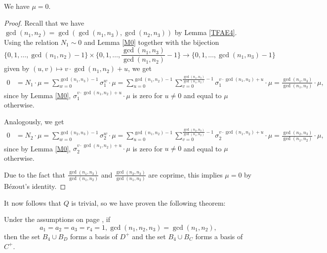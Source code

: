 \begin{prop}
We have $\mu=0.$
\end{prop}
\begin{proof}
Recall that we have $\gcd(n_1,n_2)=\gcd(\gcd(n_1,n_3),\gcd(n_2,n_3))$ by Lemma \ref{TFAE4}. Using the relation $N_1\sim 0$ and Lemma \ref{M0} together with the bijection $$\{0,1,\dots,\gcd(n_1,n_2)-1\}\times \{0,1,\dots,\frac{\gcd(n_1,n_3)}{\gcd(n_1,n_2)}-1\}\to \{0,1,\dots, \gcd(n_1,n_3)-1\}$$
given by $(u,v)\mapsto v\cdot \gcd(n_1,n_2)+u$, we get
\begin{align*}
0&=N_1\cdot \mu=\sum_{w=0}^{\gcd(n_1,n_3)-1}\sigma_1^w\cdot \mu=\sum_{u=0}^{\gcd(n_1,n_2)-1}\sum_{v=0}^{\frac{\gcd(n_1,n_3)}{\gcd(n_1,n_2)}-1}\sigma_1^{ v\cdot \gcd(n_1,n_2)+u}\cdot \mu
=\frac{\gcd(n_1,n_3)}{\gcd(n_1,n_2)}\cdot \mu,
\end{align*}
since by Lemma \ref{M0}, $\sigma_1^{ v\cdot \gcd(n_1,n_2)+u}\cdot \mu$ is zero for $u\neq 0$ and equal to $\mu$ otherwise.

Analogously, we get 
\begin{align*}
0&=N_2\cdot \mu=\sum_{w=0}^{\gcd(n_2,n_3)-1}\sigma_2^w\cdot \mu=\sum_{u=0}^{\gcd(n_1,n_2)-1}\sum_{v=0}^{\frac{\gcd(n_2,n_3)}{\gcd(n_1,n_2)}-1}\sigma_2^{ v\cdot \gcd(n_1,n_2)+u}\cdot \mu
=\frac{\gcd(n_2,n_3)}{\gcd(n_1,n_2)}\cdot \mu,
\end{align*}
since by Lemma \ref{M0}, $\sigma_2^{ v\cdot \gcd(n_1,n_2)+u}\cdot \mu$ is zero for $u\neq 0$ and equal to $\mu$ otherwise.

Due to the fact that $\frac{\gcd(n_1,n_3)}{\gcd(n_1,n_2)}$ and $\frac{\gcd(n_2,n_3)}{\gcd(n_1,n_2)}$ are coprime, this implies $\mu=0$ by Bézout's identity.
\end{proof}

It now follows that $Q$ is trivial, so we have proven the following theorem:
\begin{theorem}
Under the assumptions on page \pageref{assum}, if $$a_1=a_2=a_3=r_4=1,\gcd(n_1,n_2,n_3)=\gcd(n_1,n_2),$$ then the set $B_{4}\cup B_D$ forms a basis of $D^+$ and the set $B_{4}\cup B_C$ forms a basis of $C^+$.
\end{theorem}
